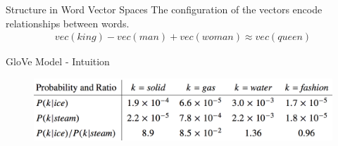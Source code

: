 \begin{frame}{Structure in Word Vector Spaces}
  The configuration of the vectors encode relationships between words.
  \begin{align*}
    vec(king) - vec(man) + vec(woman) \approx vec(queen)
  \end{align*}
  \pause
\end{frame}


\begin{frame}{GloVe Model - Intuition}
  \begin{figure}
    \includegraphics[scale=0.23]{images/glove_int.png}
  \end{figure}
\end{frame}

